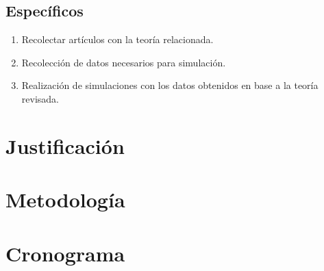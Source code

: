 \subsection{Específicos}
\begin{enumerate}
	\item Recolectar artículos con la teoría relacionada.
	\item Recolección de datos necesarios para simulación.
	\item Realización de simulaciones con los datos obtenidos en base a la teoría revisada.
\end{enumerate}


\section{Justificación}





\section{Metodología}






\section{Cronograma}









